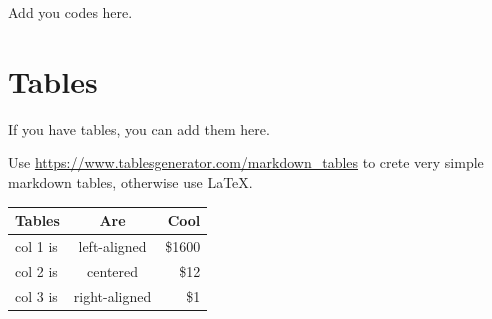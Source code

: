 \documentclass[mstat,12pt]{unswthesis}
\begin{document}
Add you codes here.

\hypertarget{tables}{%
\section*{\texorpdfstring{\textbf{Tables}}{Tables}}\label{tables}}

If you have tables, you can add them here.

Use \url{https://www.tablesgenerator.com/markdown_tables} to crete very
simple markdown tables, otherwise use \LaTeX.

\begin{longtable}[]{@{}lcr@{}}
\toprule
Tables & Are & Cool \\
\midrule
\endhead
col 1 is & left-aligned & \$1600 \\
col 2 is & centered & \$12 \\
col 3 is & right-aligned & \$1 \\
\bottomrule
\end{longtable}
\end{document}
